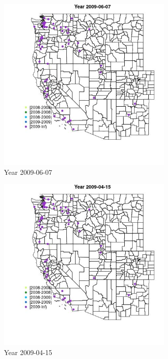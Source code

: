 \begin{figure} 
\centering  
\includegraphics[width=0.77\textwidth]{Code_Outputs/Report_ML_input_PM25_Step4_part_e_de_duplicated_aves_MapObsYear2009-06-07.jpg} 
\caption{\label{fig:Report_ML_input_PM25_Step4_part_e_de_duplicated_avesMapObsYear2009-06-07}Year 2009-06-07} 
\end{figure} 
 

\begin{figure} 
\centering  
\includegraphics[width=0.77\textwidth]{Code_Outputs/Report_ML_input_PM25_Step4_part_e_de_duplicated_aves_MapObsYear2009-04-15.jpg} 
\caption{\label{fig:Report_ML_input_PM25_Step4_part_e_de_duplicated_avesMapObsYear2009-04-15}Year 2009-04-15} 
\end{figure} 
 

